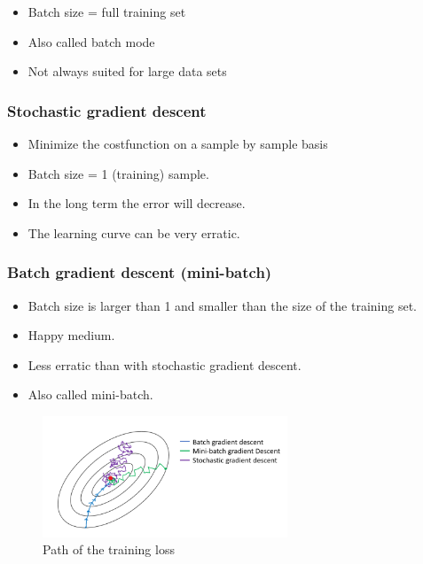 \documentclass{article}
\begin{document}
\begin{itemize}
    \item Batch size = full training set
    \item Also called batch mode
    \item Not always suited for large data sets
\end{itemize}


\subsubsection{Stochastic gradient descent}

\begin{itemize}
    \item Minimize the costfunction on a sample by sample basis
    \item Batch size = 1 (training) sample.
    \item In the long term the error will decrease.
    \item The learning curve can be very erratic.
\end{itemize}

\subsubsection{Batch gradient descent (mini-batch)}

\begin{itemize}
    \item Batch size is larger than 1 and smaller than the size of the training set.
    \item Happy medium.
    \item Less erratic than with stochastic gradient descent.
    \item Also called mini-batch.
\end{itemize}

\begin{figure}[H]
    \centering
    \includegraphics[width=0.65\textwidth]{img/gradient-descent-modes.png}
    \caption{Path of the training loss}
\end{figure}
\end{document}
